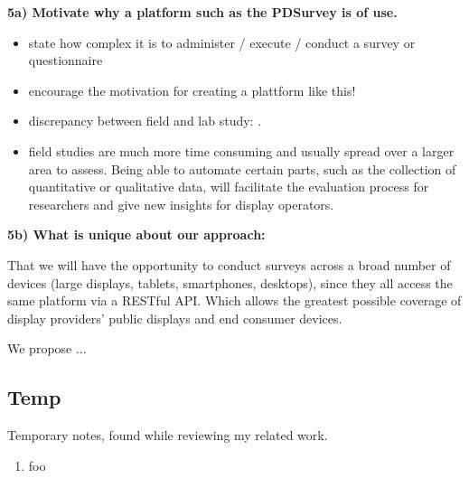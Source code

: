 

	\textbf{5a) Motivate why a platform such as the PDSurvey is of use. }

		\begin{itemize}[itemsep=0pt] 
		\item state how complex it is to administer / execute / conduct a survey or questionnaire
		\item encourage the motivation for creating a plattform like this!
		\item discrepancy between field and lab study: \cite{Ojala2011}.
		\item field studies are much more time consuming and usually spread over a larger area to assess. Being able to automate certain parts, such as the collection of quantitative or qualitative data, will facilitate the evaluation process for researchers and give new insights for display operators.
		\end{itemize}

	\textbf{5b) What is unique about our approach:}

		That we will have the opportunity to conduct surveys across a broad number of devices (large displays, tablets, smartphones, desktops), since they all access the same platform via a RESTful API. Which allows the greatest possible coverage of display providers' public displays and end consumer devices.

		We propose ...






\subsection{Temp}

	Temporary notes, found while reviewing my related work.


	\begin{enumerate}
	\item foo
	\end{enumerate}
